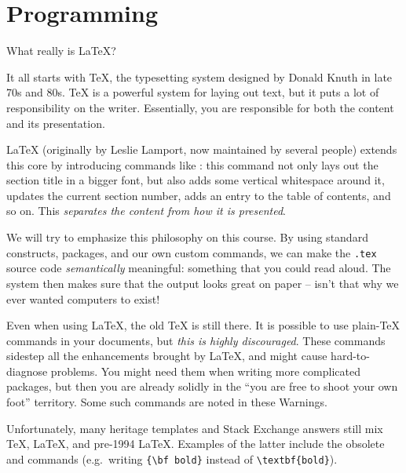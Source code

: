 
\chapter{Programming}

What really is \LaTeX?

It all starts with \TeX, the typesetting system designed by Donald Knuth in late 70s and 80s.
\TeX{} is a powerful system for laying out text,
but it puts a lot of responsibility on the writer.
Essentially, you are responsible for both the content and its presentation.

\LaTeX{} (originally by Leslie Lamport, now maintained by several people)
extends this core by introducing commands like :
this command not only lays out the section title in a bigger font,
but also adds some vertical whitespace around it, updates the current section number,
adds an entry to the table of contents, and so on.
This \emph{separates the content from how it is presented}.

We will try to emphasize this philosophy on this course.
By using standard constructs, packages, and our own custom commands,
we can make the \verb|.tex| source code \emph{semantically} meaningful:
something that you could read aloud.
The system then makes sure that the output looks great on paper
-- isn't that why we ever wanted computers to exist!


\begin{warning}
Even when using \LaTeX{}, the old \TeX{} is still there.
It is possible to use plain-\TeX{} commands in your documents,
but \emph{this is highly discouraged}.
These commands sidestep all the enhancements brought by \LaTeX,
and might cause hard-to-diagnose problems.
You might need them when writing more complicated packages,
but then you are already solidly in the ``you are free to shoot your own foot'' territory.
Some such commands are noted in these Warnings.

Unfortunately, many heritage templates and Stack Exchange answers still mix
\TeX{}, \LaTeX, and pre-1994 \LaTeX.
Examples of the latter include the obsolete  and  commands
(e.g.\ writing \verb|{\bf bold}| instead of \verb|\textbf{bold}|).
\end{warning}


